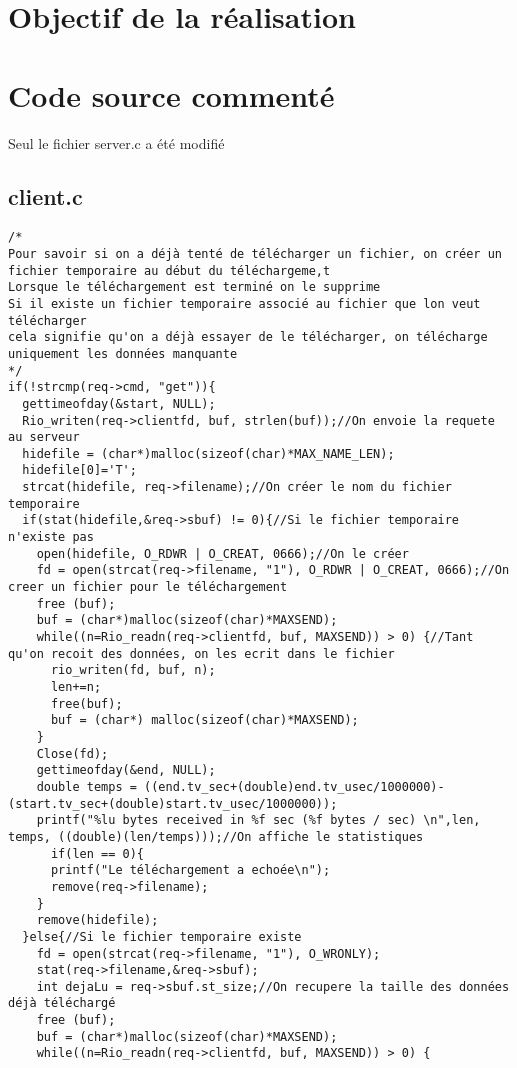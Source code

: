 \documentclass{report}
\begin{document}
      \section{Objectif de la r\'ealisation}
      \section{Code source comment\'e}
      Seul le fichier server.c a \'et\'e modifi\'e
            \subsection{client.c}
            \begin{lstlisting}
/*
Pour savoir si on a déjà tenté de télécharger un fichier, on créer un fichier temporaire au début du téléchargeme,t
Lorsque le téléchargement est terminé on le supprime
Si il existe un fichier temporaire associé au fichier que lon veut télécharger
cela signifie qu'on a déjà essayer de le télécharger, on télécharge uniquement les données manquante
*/
if(!strcmp(req->cmd, "get")){
  gettimeofday(&start, NULL);
  Rio_writen(req->clientfd, buf, strlen(buf));//On envoie la requete au serveur
  hidefile = (char*)malloc(sizeof(char)*MAX_NAME_LEN);
  hidefile[0]='T';
  strcat(hidefile, req->filename);//On créer le nom du fichier temporaire
  if(stat(hidefile,&req->sbuf) != 0){//Si le fichier temporaire n'existe pas
    open(hidefile, O_RDWR | O_CREAT, 0666);//On le créer
    fd = open(strcat(req->filename, "1"), O_RDWR | O_CREAT, 0666);//On creer un fichier pour le téléchargement
    free (buf);
    buf = (char*)malloc(sizeof(char)*MAXSEND);
    while((n=Rio_readn(req->clientfd, buf, MAXSEND)) > 0) {//Tant qu'on recoit des données, on les ecrit dans le fichier
      rio_writen(fd, buf, n);
      len+=n;
      free(buf);
      buf = (char*) malloc(sizeof(char)*MAXSEND);
    }
    Close(fd);
    gettimeofday(&end, NULL);
    double temps = ((end.tv_sec+(double)end.tv_usec/1000000)-(start.tv_sec+(double)start.tv_usec/1000000));
    printf("%lu bytes received in %f sec (%f bytes / sec) \n",len, temps, ((double)(len/temps)));//On affiche le statistiques
      if(len == 0){
      printf("Le téléchargement a echoée\n");
      remove(req->filename);
    }
    remove(hidefile);
  }else{//Si le fichier temporaire existe
    fd = open(strcat(req->filename, "1"), O_WRONLY);
    stat(req->filename,&req->sbuf);
    int dejaLu = req->sbuf.st_size;//On recupere la taille des données déjà téléchargé
    free (buf);
    buf = (char*)malloc(sizeof(char)*MAXSEND);
    while((n=Rio_readn(req->clientfd, buf, MAXSEND)) > 0) {

\end{lstlisting}
\end{document}
